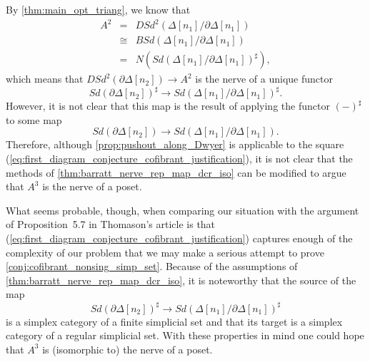 By \cref{thm:main_opt_triang}, we know that
\begin{displaymath}
\begin{array}{rcl}
A^2 & = & DSd^2(\Delta [n_1]/\partial \Delta [n_1]) \\
& \cong & BSd(\Delta [n_1]/\partial \Delta [n_1]) \\
& = & N(Sd(\Delta [n_1]/\partial \Delta [n_1])^\sharp ),
\end{array}
\end{displaymath}
which means that $DSd^2(\partial \Delta [n_2])\to A^2$ is the nerve of a unique functor
\[Sd(\partial \Delta [n_2])^\sharp \to Sd(\Delta [n_1]/\partial \Delta [n_1])^\sharp .\]
However, it is not clear that this map is the result of applying the functor $(-)^\sharp$ to some map
\[Sd(\partial \Delta [n_2])\to Sd(\Delta [n_1]/\partial \Delta [n_1]).\]
Therefore, although \cref{prop:pushout_along_Dwyer} is applicable to the square (\ref{eq:first_diagram_conjecture_cofibrant_justification}), it is not clear that the methods of \cref{thm:barratt_nerve_rep_map_dcr_iso} can be modified to argue that $A^3$ is the nerve of a poset.

What seems probable, though, when comparing our situation with the argument of Proposition~5.7 in Thomason's article \cite[p.~323]{Th80} is that (\ref{eq:first_diagram_conjecture_cofibrant_justification}) captures enough of the complexity of our problem that we may make a serious attempt to prove \cref{conj:cofibrant_nonsing_simp_set}. Because of the assumptions of \cref{thm:barratt_nerve_rep_map_dcr_iso}, it is noteworthy that the source of the map
\begin{equation}
\label{eq:second_diagram_conjecture_cofibrant_justification}
Sd(\partial \Delta [n_2])^\sharp \to Sd(\Delta [n_1]/\partial \Delta [n_1])^\sharp
\end{equation}
is a simplex category of a finite simplicial set and that its target is a simplex category of a regular simplicial set. With these properties in mind one could hope that $A^3$ is (isomorphic to) the nerve of a poset.




